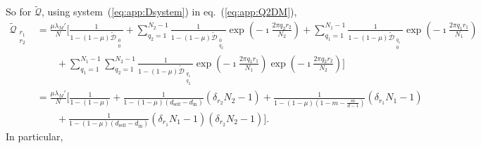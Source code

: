 \documentclass[11pt, letterpaper]{article}
\renewcommand{\eqref}[1]{\textup{{\normalfont eq.~(\ref{#1}}\normalfont)}}
\newcommand{\sysref}[1]{system~(\ref{#1})}
\newcommand{\din}{d_{\textrm{in}}}
\newcommand{\dself}{d_{\textrm{self}}}
\begin{document}
%
So for $\tilde{\mathcal{Q}}$, using \sysref{eq:app:Dsystem} in \eqref{eq:app:Q2DM}, 
%
\begin{align}
\tilde{\mathcal{Q}}_{\substack{r_1\\r_2}}&= \frac{\mu \lambda_M'}{N} \Bigg[  \frac{1}{1 - (1-\mu) \tilde{\mathcal{D}}_{\substack{0\\ 0}}} + \sum_{q_2 = 1}^{N_2-1}\frac{1}{1 - (1-\mu) \tilde{\mathcal{D}}_{\substack{0\\ q_2}}} \exp\left(-\imath \frac{2\pi q_2 r_2}{N_2}\right) %
+ \sum_{q_1 =1}^{N_1 - 1} \frac{1}{1 - (1-\mu) \tilde{\mathcal{D}}_{\substack{q_1\\ 0}}} \exp\left(-\imath \frac{2\pi q_1 r_1}{N_1}\right) \nonumber \\
& \qquad 
+ 
 \sum_{q_1=1}^{N_1 -1} \sum_{q_2=1}^{N_2 -1} \frac{1}{1 - (1-\mu) \tilde{\mathcal{D}}_{\substack{q_1\\ q_2}}} \exp\left(-\imath \frac{2\pi q_1 r_1}{N_1}\right)\exp\left(-\imath \frac{2\pi q_2 r_2}{N_2}\right) \Bigg]\nonumber \\
& = \frac{\mu \lambda_M'}{N} \Bigg[  \frac{1}{1 - (1-\mu) } 
+ \frac{1}{1 - (1-\mu) (\dself - \din)} (\delta_{r_2} N_2 - 1) %
+  \frac{1}{1 - (1-\mu) (1-m-\frac{m}{d-1})} (\delta_{r_1} N_1 - 1) \nonumber \\
& \qquad 
+ 
\frac{1}{1 - (1-\mu) (\dself - \din) } (\delta_{r_1} N_1 - 1) (\delta_{r_2} N_2 - 1) \Bigg].\label{eq:app:Q2DMsol}
% 
\end{align}
In particular, 
\end{document}
